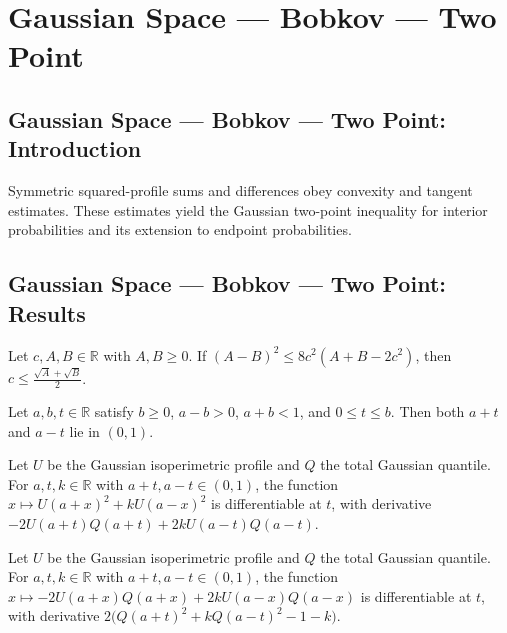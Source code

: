 \section{Gaussian Space --- Bobkov --- Two Point}
\subsection*{Gaussian Space --- Bobkov --- Two Point: Introduction}
Symmetric squared-profile sums and differences obey convexity and tangent estimates. These estimates yield the Gaussian two-point inequality for interior probabilities and its extension to endpoint probabilities.

\subsection*{Gaussian Space --- Bobkov --- Two Point: Results}

\begin{lemma}
\leanok
{}
Let $c,A,B\in\mathbb R$ with $A,B\ge0$. If $(A-B)^2\le8c^2(A+B-2c^2)$, then
$c\le\frac{\sqrt A+\sqrt B}{2}$.
\end{lemma}

\begin{lemma}
\leanok
{}
Let $a,b,t\in\mathbb R$ satisfy $b\ge0$, $a-b>0$, $a+b<1$, and $0\le t\le b$. Then both
$a+t$ and $a-t$ lie in $(0,1)$.
\end{lemma}

\begin{lemma}
\leanok
{}
Let $U$ be the Gaussian isoperimetric profile and $Q$ the total Gaussian quantile. For
$a,t,k\in\mathbb R$ with $a+t,a-t\in(0,1)$, the function $x\mapsto U(a+x)^2+kU(a-x)^2$
is differentiable at $t$, with derivative $-2U(a+t)Q(a+t)+2kU(a-t)Q(a-t)$.
\end{lemma}

\begin{lemma}
\leanok
{}
Let $U$ be the Gaussian isoperimetric profile and $Q$ the total Gaussian quantile. For
$a,t,k\in\mathbb R$ with $a+t,a-t\in(0,1)$, the function
$x\mapsto-2U(a+x)Q(a+x)+2kU(a-x)Q(a-x)$ is differentiable at $t$, with derivative
$2\bigl(Q(a+t)^2+kQ(a-t)^2-1-k\bigr)$.
\end{lemma}

